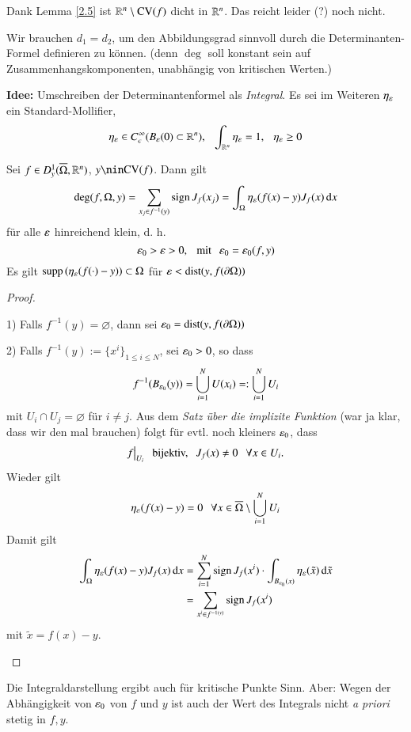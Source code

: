\noindent Dank Lemma \ref{2.5} ist $\mathbb{R}^n\setminus \mathrm{CV}(f)$ dicht in $\mathbb{R}^n$. Das reicht leider (?)
noch nicht.

\noindent Wir brauchen $d_1=d_2$, um den Abbildungsgrad sinnvoll durch die Determinanten-Formel
definieren zu können. (denn $\deg$ soll konstant sein auf Zusammenhangskomponenten, unabhängig
von kritischen Werten.)

\textbf{Idee:} Umschreiben der Determinantenformel als \textit{Integral}.
Es sei im Weiteren $\eta_\varepsilon$ ein Standard-Mollifier, 
\[
    \eta_\varepsilon \in C^\infty_c(B_\varepsilon(0)\subset \mathbb{R}^n), \hspace{.25cm} \int_{\mathbb{R}^n} \eta_\varepsilon=1,\hspace{.25cm} \eta_\varepsilon\geq 0
\]

\begin{lem}\label{2.6}
    Sei $f\in D^1_y(\overline \Omega, \mathbb{R}^n)$, $y\nin \CV(f)$. Dann gilt
    \begin{align}\label{5}
        \deg(f,\Omega,y)=\sum_{x_j\in f^{-1}(y)}\mathrm{sign}\, J_f(x_j)=\int_\Omega \eta_\varepsilon (f(x)-y) J_f(x)\, \mathrm{d} x
    \end{align}
    für alle $\varepsilon$ hinreichend klein, d. h.
    \[
        \varepsilon_0>\varepsilon>0, \hspace{.25cm} \text{mit} \hspace{.25cm} \varepsilon_0=\varepsilon_0(f,y)
    \]
    Es gilt $\mathrm{supp}\, (\eta_\varepsilon(f(\cdot)-y))\subset \Omega$ für $\varepsilon < \mathrm{dist}(y,f(\partial \Omega))$
\end{lem}

\begin{proof}
    \begin{description}
        \item{1)} 
        Falls $f^{-1}(y)=\varnothing$, dann sei $\varepsilon_0=\mathrm{dist}(y,f(\partial \Omega))$
        \item{2)}
        Falls $f^{-1}(y):= \{x^i\}_{1\leq i \leq N}$, sei $\varepsilon_0>0$, so dass
        \[
            f^{-1}(B_{\varepsilon_0}(y)) = \bigcup_{i=1}^N U(x_i)=:\bigcup_{i=1}^N U_i
        \]
        mit $U_i\cap U_j=\varnothing$ für $i\neq j$.
        Aus dem \textit{Satz über die implizite Funktion} (war ja klar, dass wir den mal brauchen)
        folgt für evtl. noch kleiners $\varepsilon_0$, dass
        \[
            f\big|_{U_i} \hspace{.25cm} \text{bijektiv,} \hspace{.25cm} J_f(x)\neq 0 \hspace{.25cm} \forall x \in U_i.
        \]
        Wieder gilt
        \[
            \eta _{\varepsilon}(f(x)-y)=0 \hspace{.25cm} \forall x\in \overline \Omega \setminus \bigcup _{i=1}^N U_i
        \]
        Damit gilt
        \begin{align*}
            \int_\Omega \eta_\varepsilon(f(x)-y) J_f(x) \, \mathrm{d} x&= \sum_{i=1}^N \mathrm{sign}\, J_f(x^i)\cdot
            \int_{B_{\varepsilon_0}(x)}\eta_\varepsilon (\tilde x ) \, \mathrm{d} \tilde x\\
            &=\sum_{x^i\in f^{-1(y)}} \mathrm{sign}\,  J_f(x^i)
        \end{align*}
        mit $\tilde x=f(x)-y$.
    \end{description}
    \[ \]
\end{proof}
Die Integraldarstellung ergibt auch für kritische Punkte Sinn. Aber:
Wegen der Abhängigkeit von $\varepsilon_0$ von $f$ und $y$ ist auch der Wert des Integrals nicht
\textit{a priori} stetig in $f,y$.


